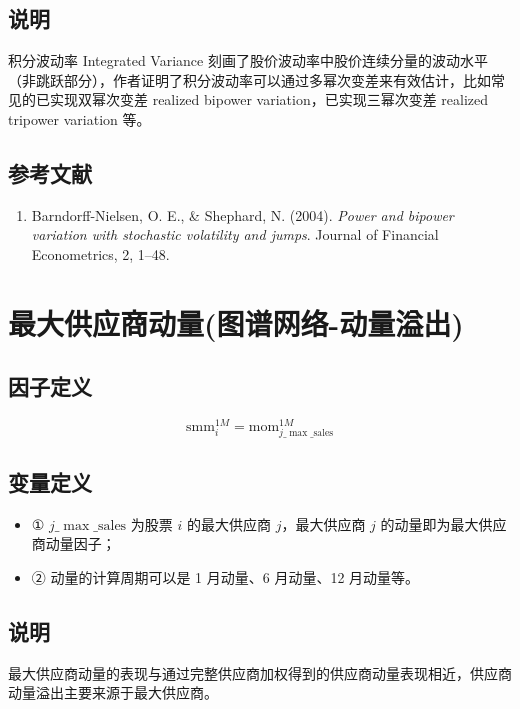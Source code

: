 \documentclass{article}
\begin{document}
\subsection{说明}
积分波动率 Integrated Variance 刻画了股价波动率中股价连续分量的波动水平（非跳跃部分），作者证明了积分波动率可以通过多幂次变差来有效估计，比如常见的已实现双幂次变差 realized bipower variation，已实现三幂次变差 realized tripower variation 等。

\subsection{参考文献}
\begin{enumerate}
    \item Barndorff-Nielsen, O. E., \& Shephard, N. (2004). \textit{Power and bipower variation with stochastic volatility and jumps}. Journal of Financial Econometrics, 2, 1–48.
\end{enumerate}

\section{最大供应商动量(图谱网络-动量溢出)}

\subsection{因子定义}
\begin{equation}
    \mathrm{smm}_i^{1M} = \mathrm{mom}_{j\_{\max\_\mathrm{sales}}}^{1M}
\end{equation}

\subsection{变量定义}
\begin{itemize}
    \item ① \( j\_{\max\_\mathrm{sales}} \) 为股票 \( i \) 的最大供应商 \( j \)，最大供应商 \( j \) 的动量即为最大供应商动量因子；
    \item ② 动量的计算周期可以是 1 月动量、6 月动量、12 月动量等。
\end{itemize}

\subsection{说明}
最大供应商动量的表现与通过完整供应商加权得到的供应商动量表现相近，供应商动量溢出主要来源于最大供应商。
\end{document}
